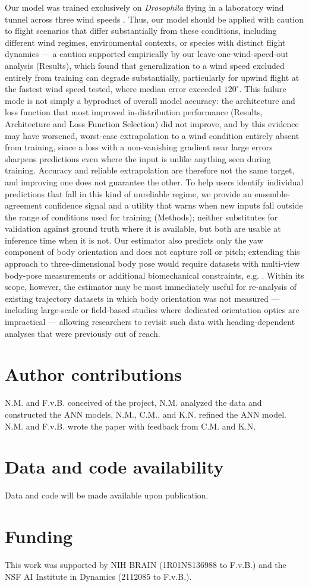 \documentclass[11pt]{article}
\begin{document}
Our model was trained exclusively on \textit{Drosophila} flying in a laboratory wind tunnel across three wind speeds \citep{van2014plume}. Thus, our model should be applied with caution to flight scenarios that differ substantially from these conditions, including different wind regimes, environmental contexts, or species with distinct flight dynamics --- a caution supported empirically by our leave-one-wind-speed-out analysis (Results), which found that generalization to a wind speed excluded entirely from training can degrade substantially, particularly for upwind flight at the fastest wind speed tested, where median error exceeded $120^\circ$. This failure mode is not simply a byproduct of overall model accuracy: the architecture and loss function that most improved in-distribution performance (Results, Architecture and Loss Function Selection) did not improve, and by this evidence may have worsened, worst-case extrapolation to a wind condition entirely absent from training, since a loss with a non-vanishing gradient near large errors sharpens predictions even where the input is unlike anything seen during training. Accuracy and reliable extrapolation are therefore not the same target, and improving one does not guarantee the other. To help users identify individual predictions that fall in this kind of unreliable regime, we provide an ensemble-agreement confidence signal and a utility that warns when new inputs fall outside the range of conditions used for training (Methods); neither substitutes for validation against ground truth where it is available, but both are usable at inference time when it is not. Our estimator also predicts only the yaw component of body orientation and does not capture roll or pitch; extending this approach to three-dimensional body pose would require datasets with multi-view body-pose measurements or additional biomechanical constraints, e.g. \citep{muijres2014flies}. Within its scope, however, the estimator may be most immediately useful for re-analysis of existing trajectory datasets in which body orientation was not measured --- including large-scale or field-based studies \citep{stentiford2025precise} where dedicated orientation optics are impractical --- allowing researchers to revisit such data with heading-dependent analyses that were previously out of reach.


\section*{Author contributions}
N.M. and F.v.B. conceived of the project, N.M. analyzed the data and constructed the ANN models, N.M., C.M., and K.N. refined the ANN model. N.M. and F.v.B. wrote the paper with feedback from C.M. and K.N.


\section*{Data and code availability} 
Data and code will be made available upon publication.

\section*{Funding}
This work was supported by NIH BRAIN (1R01NS136988 to F.v.B.) and the NSF AI Institute in Dynamics (2112085 to F.v.B.). 


\end{document}
